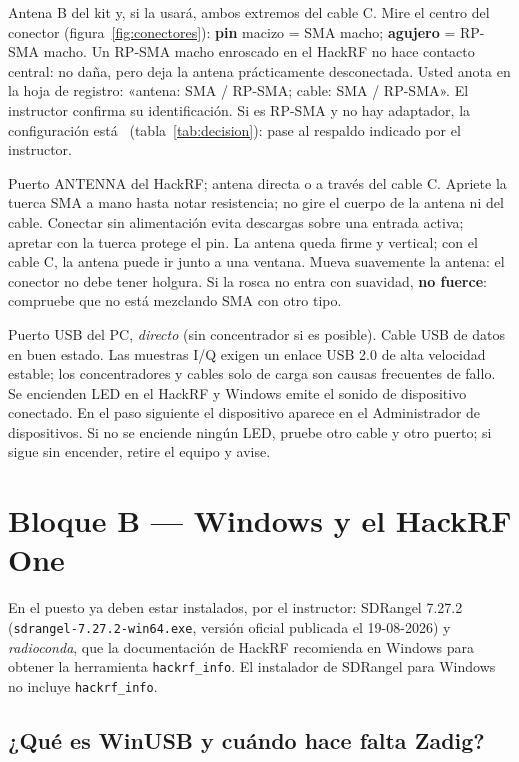 {Antena B del kit y, si la usará, ambos extremos del cable C.}
{Mire el centro del conector (figura~\ref{fig:conectores}): \textbf{pin} macizo = SMA macho; \textbf{agujero} = RP-SMA macho.}
{Un RP-SMA macho enroscado en el HackRF no hace contacto central: no daña, pero deja la antena prácticamente desconectada.}
{Usted anota en la hoja de registro: «antena: SMA / RP-SMA; cable: SMA / RP-SMA».}
{El instructor confirma su identificación.}
{Si es RP-SMA y no hay adaptador, la configuración está \BLOQ\ (tabla~\ref{tab:decision}): pase al respaldo indicado por el instructor.}

{Puerto ANTENNA del HackRF; antena directa o a través del cable C.}
{Apriete la tuerca SMA a mano hasta notar resistencia; no gire el cuerpo de la antena ni del cable.}
{Conectar sin alimentación evita descargas sobre una entrada activa; apretar con la tuerca protege el pin.}
{La antena queda firme y vertical; con el cable C, la antena puede ir junto a una ventana.}
{Mueva suavemente la antena: el conector no debe tener holgura.}
{Si la rosca no entra con suavidad, \textbf{no fuerce}: compruebe que no está mezclando SMA con otro tipo.}

{Puerto USB del PC, \emph{directo} (sin concentrador si es posible).}
{Cable USB de datos en buen estado.}
{Las muestras I/Q exigen un enlace USB 2.0 de alta velocidad estable; los concentradores y cables solo de carga son causas frecuentes de fallo.}
{Se encienden LED en el HackRF y Windows emite el sonido de dispositivo conectado.}
{En el paso siguiente el dispositivo aparece en el Administrador de dispositivos.}
{Si no se enciende ningún LED, pruebe otro cable y otro puerto; si sigue sin encender, retire el equipo y avise.}

\section{Bloque B --- Windows y el HackRF One}
\label{sec:w-windows}

En el puesto ya deben estar instalados, por el instructor: SDRangel 7.27.2 (\texttt{sdrangel-7.27.2-win64.exe}, versión oficial publicada el 19-08-2026) y \emph{radioconda}, que la documentación de HackRF recomienda en Windows para obtener la herramienta \texttt{hackrf\_info}. El instalador de SDRangel para Windows no incluye \texttt{hackrf\_info}.

\subsection{¿Qué es WinUSB y cuándo hace falta Zadig?}

